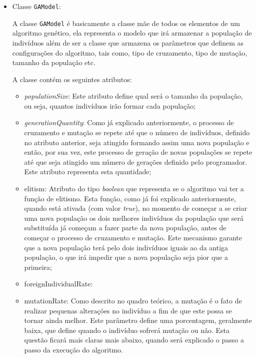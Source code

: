 \begin{itemize}
	
	\item Classe \texttt{GAModel}:
	\par A classe \texttt{GAModel} é basicamente a classe mãe de todos os elementos de um algoritmo genético, ela representa o modelo que irá armazenar a população de indivíduos além de ser a classe que armazena os parâmetros que definem as configurações do algoritmo, tais como, tipo de cruzamento, tipo de mutação, tamanho da população etc.
	
	\par A classe contém os seguintes atributos:
	
	\begin{itemize} 
		\item \textit{populationSize}:
		Este atributo define qual será o tamanho da população, ou seja, quantos indivíduos irão formar cada população;
		
		\item \textit{generationQuantity}:
		Como já explicado anteriormente, o processo de cruzamento e mutação se repete até que o número de indivíduos, definido 
		no atributo anterior, seja atingido formando assim uma nova população e então, por sua vez, este processo de geração 
		de novas populações se repete até que seja atingido um número de gerações definido pelo programador. Este atributo 
		representa esta quantidade;
		
		\item{elitism}:
		Atributo do tipo \textit{boolean} que representa se o algoritmo vai ter a função de elitismo. Esta função, como já foi
		explicado anteriormente, quando está ativada (com valor \textit{true}), no momento de começar a se criar uma nova população os dois melhores indivíduos da população que será substituída já começam a fazer parte da nova população, antes de começar o processo de cruzamento e mutação. Este mecanismo garante que a nova população terá pelo dois indivíduos iguais ao da antiga população, o que irá impedir que a nova população seja pior que a primeira;
		
		\item{foreignIndividualRate}:
		
		
		\item{mutationRate}:
		Como descrito no quadro teórico, a mutação é o fato de realizar pequenas alterações no indivíduo a fim de que este possa se tornar ainda melhor. Este parâmetro define uma porcentagem, geralmente baixa, que define quando o indivíduo sofrerá mutação ou não. Esta questão ficará mais claras mais abaixo, quando será explicado o passo a passo da execução do algoritmo.
		

\end{itemize}
\end{itemize}

